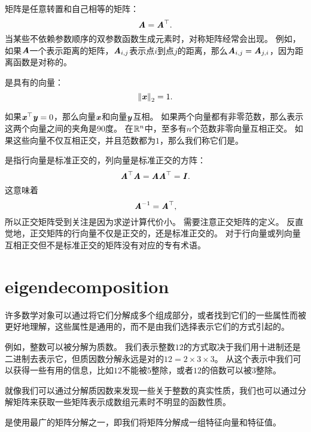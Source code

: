 
矩阵是任意转置和自己相等的矩阵：
\begin{equation}
    \boldsymbol{\mathit{A}}=\boldsymbol{\mathit{A}}^\top.
\end{equation}
当某些不依赖参数顺序的双参数函数生成元素时，对称矩阵经常会出现。
例如，如果$\boldsymbol{\mathit{A}}$一个表示距离的矩阵，$\boldsymbol{\mathit{A}}_{i,j}$表示点$i$到点$j$的距离，那么$\boldsymbol{\mathit{A}}_{i,j}=\boldsymbol{\mathit{A}}_{j,i}$，因为距离函数是对称的。


是具有的向量：
\begin{equation}
\left\lVert\boldsymbol{\mathit{x}}\right\rVert_2=1.
\end{equation}


如果$\boldsymbol{\mathit{x}}^\top \boldsymbol{\mathit{y}} = 0$，那么向量$\boldsymbol{\mathit{x}}$和向量$\boldsymbol{\mathit{y}}$互相。
如果两个向量都有非零范数，那么表示这两个向量之间的夹角是$90$度。
在$\mathbb{R}^n$中，至多有$n$个范数非零向量互相正交。
如果这些向量不仅互相正交，并且范数都为$1$，那么我们称它们是。


是指行向量是标准正交的，列向量是标准正交的方阵：
\begin{equation}
    \boldsymbol{\mathit{A}}^\top\boldsymbol{\mathit{A}}=\boldsymbol{\mathit{A}}\boldsymbol{\mathit{A}}^\top=\boldsymbol{\mathit{I}}.
\end{equation}
这意味着 
\begin{equation}
    \boldsymbol{\mathit{A}}^{-1}=\boldsymbol{\mathit{A}}^\top,
\end{equation}
所以正交矩阵受到关注是因为求逆计算代价小。
需要注意正交矩阵的定义。
反直觉地，正交矩阵的行向量不仅是正交的，还是标准正交的。
对于行向量或列向量互相正交但不是标准正交的矩阵没有对应的专有术语。




\section{\gls{eigendecomposition}}
\label{sec:eigendecomposition}

许多数学对象可以通过将它们分解成多个组成部分，或者找到它们的一些属性而被更好地理解，这些属性是通用的，而不是由我们选择表示它们的方式引起的。


例如，整数可以被分解为质数。
我们表示整数$12$的方式取决于我们用十进制还是二进制去表示它，但质因数分解永远是对的$12=2\times 3\times 3$。
从这个表示中我们可以获得一些有用的信息，比如$12$不能被$5$整除，或者$12$的倍数可以被$3$整除。


就像我们可以通过分解质因数来发现一些关于整数的真实性质，我们也可以通过分解矩阵来获取一些矩阵表示成数组元素时不明显的函数性质。


是使用最广的矩阵分解之一，即我们将矩阵分解成一组特征向量和特征值。



